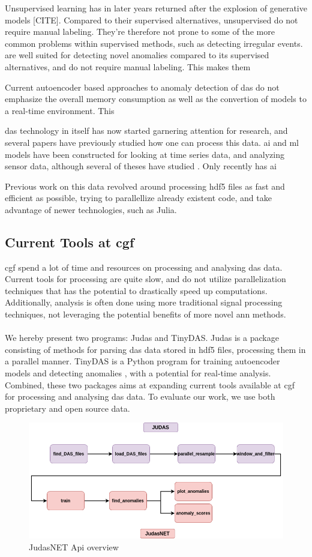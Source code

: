 Unsupervised learning has in later years returned after the explosion of generative models [CITE]. Compared to their supervised alternatives, unsupervised do not require manual labeling. They're therefore not prone to some of the more common problems within supervised methods, such as detecting irregular events.   are well suited for detecting novel anomalies \cite{wei2022lstmautoencoder, srivastava2016unsupervised} compared to its supervised alternatives, and do not require manual labeling. This makes them 

Current autoencoder based approaches to anomaly detection of \acrshort{das} do not emphasize the overall memory consumption as well as the convertion of models to a real-time environment. This 

\acrshort{das} technology in itself has now started garnering attention for research, and several papers have previously studied  how one can process this data. \acrshort{ai} and \acrshort{ml} models have been constructed for looking at time series data, and analyzing sensor data, although several of theses have studied .  Only recently has \acrshort{ai}

Previous work on this data \cite{projthesis} revolved around processing \acrshort{hdf5} files as fast and efficient as possible, trying to parallellize already existent code, and take advantage of newer technologies, such as Julia.

\subsection{Current Tools at \acrshort{cgf}}

\acrfull{cgf} spend a lot of time and resources on processing and analysing \acrshort{das} data. Current tools for processing are quite slow, and do not utilize parallelization techniques that has the potential to drastically speed up computations. Additionally, analysis is often done using more traditional signal processing techniques, not leveraging the potential benefits of more novel \acrshort{ann} methods. \\ \\  

We hereby present two programs: Judas and TinyDAS. Judas is a package consisting of methods for parsing \acrshort{das} data stored in \acrfull{hdf5} files,  processing them in a parallel manner. TinyDAS is a Python program for training autoencoder models and detecting anomalies , with a potential for real-time analysis. Combined, these two packages aims at expanding current tools available at \acrshort{cgf} for processing and analysing \acrshort{das} data. To evaluate our work, we use both proprietary and open source data. 

\begin{figure}[h]
    \centering
    \includegraphics[scale=.5]{figures/api_overview.png}
    \caption{JudasNET Api overview}
    \label{fig:judasnet_overview}
\end{figure}